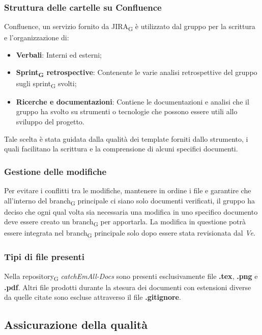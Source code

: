\subsubsection{Struttura delle cartelle su Confluence}
Confluence, un servizio fornito da JIRA\textsubscript{G} è utilizzato dal gruppo per la scrittura e l'organizzazione di:
\begin{itemize}
	\item \textbf{Verbali}: Interni ed esterni;
	\item \textbf{Sprint\textsubscript{G} retrospective}: Contenente le varie analisi retrospettive del gruppo sugli sprint\textsubscript{G} svolti;
	\item \textbf{Ricerche e documentazioni}: Contiene le documentazioni e analisi che il gruppo ha svolto su strumenti o tecnologie che possono essere utili allo sviluppo del progetto.
\end{itemize}
Tale scelta è stata guidata dalla qualità dei template forniti dallo strumento, i quali facilitano la scrittura e la comprensione di alcuni specifici documenti.

\subsubsection{Gestione delle modifiche}
Per evitare i conflitti tra le modifiche, mantenere in ordine i file e garantire che all'interno del branch\textsubscript{G} principale ci siano solo documenti verificati, il gruppo ha deciso che ogni qual volta sia necessaria una modifica in uno specifico documento deve essere creato un branch\textsubscript{G} per apportarla. La modifica in questione potrà essere integrata nel branch\textsubscript{G} principale solo dopo essere stata revisionata dal \textit{Ve}.

\subsubsection{Tipi di file presenti}
Nella repository\textsubscript{G} \textit{catchEmAll-Docs} sono presenti esclusivamente file \textbf{.tex}, \textbf{.png} e \textbf{.pdf}. Altri file prodotti durante la stesura dei documenti con estensioni diverse da quelle citate sono escluse attraverso il file \textbf{.gitignore}.



\subsection{Assicurazione della qualità}

